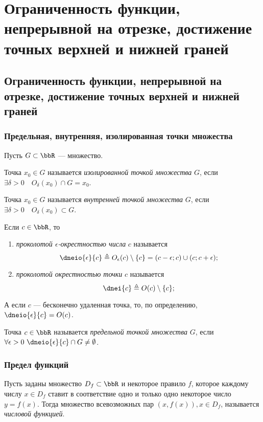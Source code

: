 \chapter{Ограниченность функции, непрерывной на отрезке, достижение точных верхней и нижней граней}

\section{Ограниченность функции, непрерывной на отрезке, достижение точных верхней и нижней граней}

\subsection{Предельная, внутренняя, изолированная точки множества}
Пусть $G \subset \bbR$ --- множество.
\begin{defn}
Точка $x_0 \in G$ называется \textit{изолированной точкой множества} $G$, если $\exists \delta >0\quad  O_\delta(x_0) \cap G = x_0$.
\end{defn}

\begin{defn}
Точка $x_0 \in G$ называется \textit{внутренней точкой множества} $G$, если $\exists \delta >0\quad O_\delta(x_0) \subset G$.
\end{defn}

\begin{defn}
Если $c \in \bbR$, то 
\begin{enumerate}
\item
\textit{проколотой $\epsilon$-окрестностью числа} $c$ называется $$\dneio{\epsilon}{c} \triangleq O_\epsilon(c)\setminus\{c\}=(c-\epsilon;c)\cup(c;c+\epsilon);$$
\item
\textit{проколотой окрестностью точки} $c$ называется $$\dnei{c} \triangleq O(c)\setminus \{c\};$$
\end{enumerate}
\textbullet\; А если $c$ --- бесконечно удаленная точка, то, по определению, $\dneio{\epsilon}{c}= O (c) $.
\end{defn}

\begin{defn}
Точка $c \in \bbR$ называется \textit{предельной точкой множества} $G$, если $\forall \epsilon >0 \ \dneio{\epsilon}{c} \cap G \ne \emptyset$.
\end{defn}

\subsection{Предел функций}
\begin{defn}
Пусть заданы множество $D_f \subset \bbR$ и некоторое правило $f$, которое каждому числу $x\in D_f$ ставит в соответствие одно и только одно некоторое число $y=f(x)$. Тогда множество всевозможных пар $(x, f(x)), x\in D_f$, называется \textit{числовой функцией}.
\end{defn}

